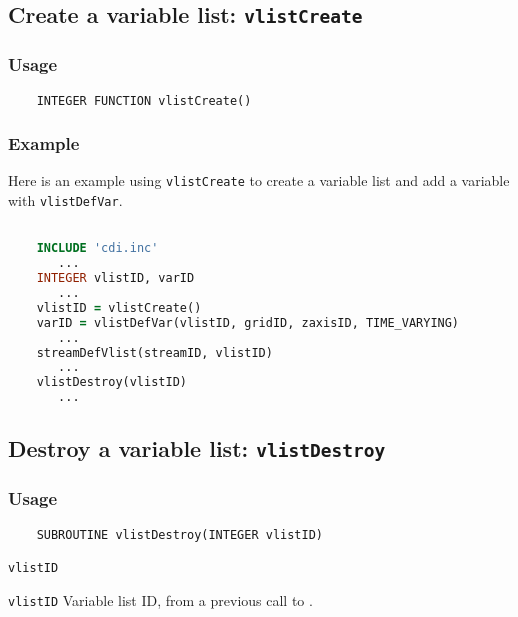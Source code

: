 

\subsection{Create a variable list: \texttt{vlistCreate}}
\label{vlistCreate}
\subsubsection*{Usage}

\begin{verbatim}
    INTEGER FUNCTION vlistCreate()
\end{verbatim}

\subsubsection*{Example}

Here is an example using {\texttt{vlistCreate}} to create a variable list
and add a variable with {\texttt{vlistDefVar}}.

\begin{lstlisting}[language=Fortran, backgroundcolor=\color{pyellow}, basicstyle=\small, columns=flexible]

    INCLUDE 'cdi.inc'
       ...
    INTEGER vlistID, varID
       ...
    vlistID = vlistCreate()
    varID = vlistDefVar(vlistID, gridID, zaxisID, TIME_VARYING)
       ...
    streamDefVlist(streamID, vlistID)
       ...
    vlistDestroy(vlistID)
       ...
\end{lstlisting}


\subsection{Destroy a variable list: \texttt{vlistDestroy}}
\label{vlistDestroy}
\subsubsection*{Usage}

\begin{verbatim}
    SUBROUTINE vlistDestroy(INTEGER vlistID)
\end{verbatim}

\hspace*{4mm}\begin{minipage}[]{15cm}
\begin{deflist}{\texttt{vlistID}\ }
\item[\texttt{vlistID}]
Variable list ID, from a previous call to {}.

\end{deflist}
\end{minipage}


